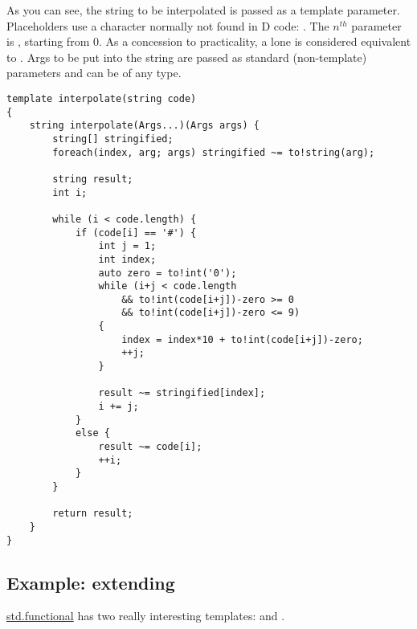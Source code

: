 As you can see, the string to be interpolated is passed as a template parameter. Placeholders use a character normally not found in D code: \DD{\#}. The $n^{th}$ parameter is , starting from 0. As a concession to practicality, a lone \DD{\#} is considered equivalent to . Args to be put into the string are passed as standard (non-template) parameters and can be of any type.

\begin{verbatim}
template interpolate(string code)
{
    string interpolate(Args...)(Args args) {
        string[] stringified;
        foreach(index, arg; args) stringified ~= to!string(arg);

        string result;
        int i;

        while (i < code.length) {
            if (code[i] == '#') {
                int j = 1;
                int index;
                auto zero = to!int('0');
                while (i+j < code.length
                    && to!int(code[i+j])-zero >= 0
                    && to!int(code[i+j])-zero <= 9)
                {
                    index = index*10 + to!int(code[i+j])-zero;
                    ++j;
                }

                result ~= stringified[index];
                i += j;
            }
            else {
                result ~= code[i];
                ++i;
            }
        }

        return result;
    }
}
\end{verbatim}


\subsection{Example: extending }\label{naryfun}

\href{www.d-programming-language.org/phobos/std_functional.html}{std.functional} has two really interesting templates:  and .


